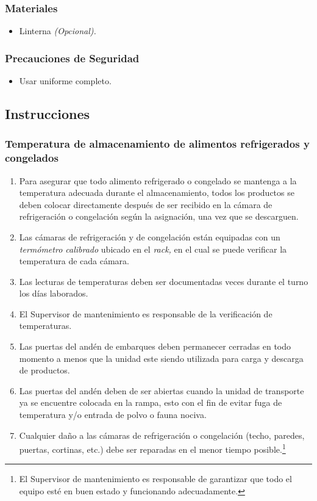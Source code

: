 \subsubsection{Materiales}
\begin{itemize}
	\item Linterna \textit{(Opcional).}
\end{itemize}

\subsubsection{Precauciones de Seguridad}
\begin{itemize}
	\item Usar uniforme completo.
\end{itemize}

\subsection{Instrucciones}
\subsubsection{Temperatura de almacenamiento de alimentos refrigerados y congelados}
\begin{enumerate}
	\item Para asegurar que todo \gls{alimento} refrigerado o congelado se mantenga a la temperatura adecuada durante el almacenamiento, todos los productos se deben colocar directamente después de ser recibido en la cámara de refrigeración o congelación según la asignación, una vez que se descarguen.
	\item Las cámaras de refrigeración y de congelación están equipadas con un \emph{termómetro calibrado} ubicado en el \emph{rack,} en el cual se puede verificar la temperatura de cada cámara.
	\item Las lecturas de temperaturas deben ser documentadas \VecesTempManual veces durante el turno los días laborados.
	\item El Supervisor de mantenimiento es responsable de la verificación de temperaturas.
	\item Las puertas del andén de embarques deben permanecer cerradas en todo momento a menos que la unidad este siendo utilizada para carga y descarga de productos.
	\item Las puertas del andén deben de ser abiertas cuando la unidad de transporte ya se encuentre colocada en la rampa, esto con el fin de evitar fuga de temperatura y/o entrada de polvo o fauna nociva.
	\item Cualquier daño a las cámaras de refrigeración o congelación (techo, paredes, puertas, cortinas, etc.) debe ser reparadas en el menor tiempo posible.\footnote{El Supervisor de mantenimiento es responsable de garantizar que todo el equipo esté en buen estado y funcionando adecuadamente.}
\end{enumerate}

